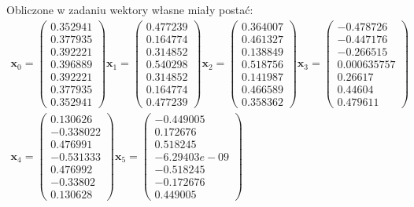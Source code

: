 \documentclass{article}
\begin{document}
Obliczone w zadaniu wektory własne miały postać:
\begin{equation}
\begin{array}{c}
	\textbf{x}_0 = 
	\begin{pmatrix}
	0.352941\\ 0.377935\\0.392221\\0.396889\\0.392221\\0.377935\\0.352941
	\end{pmatrix} 
	\textbf{x}_1 = 
	\begin{pmatrix}
	0.477239\\0.164774\\0.314852\\0.540298\\0.314852\\0.164774\\0.477239
	\end{pmatrix} 
	\textbf{x}_2 = 
	\begin{pmatrix}
	0.364007\\0.461327\\0.138849\\0.518756\\0.141987\\0.466589\\0.358362
	\end{pmatrix}
	\textbf{x}_3 = 
	\begin{pmatrix}
	-0.478726\\-0.447176\\-0.266515\\0.000635757\\0.26617\\0.44604\\0.479611
	\end{pmatrix}\\
	\textbf{x}_4 = 
	\begin{pmatrix}
	0.130626\\-0.338022\\0.476991\\-0.531333\\0.476992\\-0.33802\\0.130628
	\end{pmatrix}
	\textbf{x}_5 = 
	\begin{pmatrix}
	-0.449005\\0.172676\\0.518245\\-6.29403e-09\\-0.518245\\-0.172676\\0.449005

\end{pmatrix}
\end{array}
\end{equation}
\end{document}
